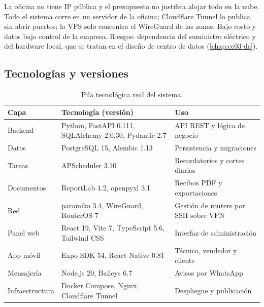 {La oficina no tiene IP pública y el presupuesto no justifica alojar todo en la nube.}
{Todo el sistema corre en un servidor de la oficina; Cloudflare Tunnel lo publica sin abrir puertos; la VPS solo concentra el WireGuard de las zonas.}
{Bajo costo y datos bajo control de la empresa. Riesgos: dependencia del suministro eléctrico y del hardware local, que se tratan en el diseño de centro de datos (\cref{chap:ce03-dc}).}

\subsection{Tecnologías y versiones}
\label{sec:ce02-stack}

\begin{table}[H]
\centering
\caption{Pila tecnológica real del sistema.}
\label{tab:ce02-stack}
\small
\begin{tabularx}{\textwidth}{L{2.8cm}L{4.6cm}X}
\toprule
\textbf{Capa} & \textbf{Tecnología (versión)} & \textbf{Uso} \\
\midrule
Backend & Python, FastAPI 0.111, SQLAlchemy 2.0.30, Pydantic 2.7 & API REST y lógica de negocio \\
Datos & PostgreSQL 15, Alembic 1.13 & Persistencia y migraciones \\
Tareas & APScheduler 3.10 & Recordatorios y cortes diarios \\
Documentos & ReportLab 4.2, openpyxl 3.1 & Recibos PDF y exportaciones \\
Red & paramiko 3.4, WireGuard, RouterOS 7 & Gestión de routers por SSH sobre VPN \\
Panel web & React 19, Vite 7, TypeScript 5.6, Tailwind CSS & Interfaz de administración \\
App móvil & Expo SDK 54, React Native 0.81 & Técnico, vendedor y cliente \\
Mensajería & Node.js 20, Baileys 6.7 & Avisos por WhatsApp \\
Infraestructura & Docker Compose, Nginx, Cloudflare Tunnel & Despliegue y publicación \\
\bottomrule
\end{tabularx}
\end{table}
